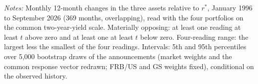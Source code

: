 \begin{table}[tbp]\centering
\caption{How Often the Four Readings Give Different Judgments}\label{tab:four}
\begin{flushleft}\footnotesize\textit{Notes:} Monthly 12-month changes in the three assets relative to $r^*$, January 1996 to September 2026 (369 months, overlapping), read with the four portfolios on the common two-year-yield scale. Materially opposing: at least one reading at least $t$ above zero and at least one at least $t$ below zero. Four-reading range: the largest less the smallest of the four readings. Intervals: 5th and 95th percentiles over 5,000 bootstrap draws of the announcements (market weights and the common response vector redrawn; FRB/US and GS weights fixed), conditional on the observed history.\end{flushleft}
\end{table}
